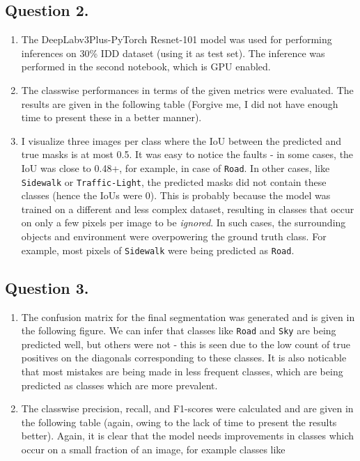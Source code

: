 \documentclass[10pt]{article}
\begin{document}
    \subsection*{\textbf{Question 2.}}
    \begin{enumerate}[label=(\alph*)]
        \item The DeepLabv3Plus-PyTorch Resnet-101 model was used for performing inferences
        on 30\% IDD dataset (using it as test set). The inference was performed in the second
        notebook, which is GPU enabled.
        \item The classwise performances in terms of the given metrics were evaluated. The results
        are given in the following table (Forgive me, I did not have enough time to present these
        in a better manner).
        \item I visualize three images per class where the IoU between the predicted and true
        masks is at most 0.5. It was easy to notice the faults - in some cases, the IoU was close to
        0.48+, for example, in case of \texttt{Road}. In other cases, like \texttt{Sidewalk} or
        \texttt{Traffic-Light}, the predicted masks did not contain these classes (hence the IoUs were 0).
        This is probably because the model was trained on a different and less complex dataset,
        resulting in classes that occur on only a few pixels per image to be \textit{ignored}.
        In such cases, the surrounding objects and environment were overpowering the ground truth
        class. For example, most pixels of \texttt{Sidewalk} were being predicted as \texttt{Road}.
    \end{enumerate}

    \subsection*{\textbf{Question 3.}}
    \begin{enumerate}[label=(\alph*)]
        \item The confusion matrix for the final segmentation was generated and is given in the following
        figure. We can infer that classes like \texttt{Road} and \texttt{Sky} are being predicted well,
        but others were not - this is seen due to the low count of true positives on the diagonals
        corresponding to these classes. It is also noticable that most mistakes are being made in
        less frequent classes, which are being predicted as classes which are more prevalent.
        \item The classwise precision, recall, and F1-scores were calculated and are given in the
        following table (again, owing to the lack of time to present the results better). Again, it
        is clear that the model needs improvements in classes which occur on a small fraction of an image,
        for example classes like
    \end{enumerate}
\end{document}
